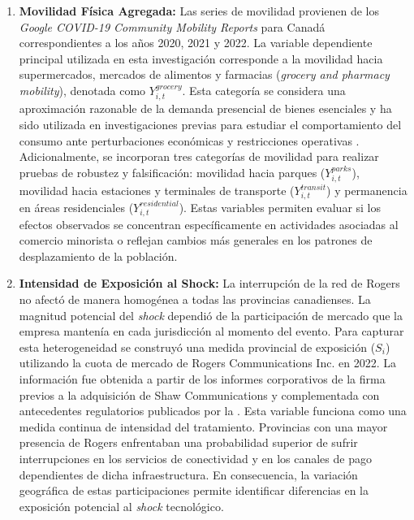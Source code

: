 \begin{enumerate}
    \item \textbf{Movilidad F\'isica Agregada:} Las series de movilidad provienen de los \textit{Google COVID-19 Community 
Mobility Reports} para Canad\'a correspondientes a los a\~nos 2020, 2021 y 2022. La variable dependiente principal utilizada en esta investigaci\'on corresponde 
a la movilidad hacia supermercados, mercados de alimentos y farmacias 
(\textit{grocery and pharmacy mobility}), denotada como $Y_{i,t}^{grocery}$. Esta 
categor\'ia se considera una aproximaci\'on razonable de la demanda presencial 
de bienes esenciales y ha sido utilizada en investigaciones previas para estudiar 
el comportamiento del consumo ante perturbaciones econ\'omicas y restricciones 
operativas \citep{chetty2020economic, bounie2020consumers}.
Adicionalmente, se incorporan tres categor\'ias de movilidad para realizar 
pruebas de robustez y falsificaci\'on: movilidad hacia parques 
($Y_{i,t}^{parks}$), movilidad hacia estaciones y terminales de transporte 
($Y_{i,t}^{transit}$) y permanencia en \'areas residenciales 
($Y_{i,t}^{residential}$). Estas variables permiten evaluar si los efectos 
observados se concentran espec\'ificamente en actividades asociadas al comercio 
minorista o reflejan cambios m\'as generales en los patrones de desplazamiento 
de la poblaci\'on.
    \item \textbf{Intensidad de Exposici\'on al Shock:} La interrupci\'on de la red de Rogers no afect\'o de manera homog\'enea a todas 
las provincias canadienses. La magnitud potencial del \textit{shock} dependi\'o 
de la participaci\'on de mercado que la empresa manten\'ia en cada jurisdicci\'on 
al momento del evento.
Para capturar esta heterogeneidad se construy\'o una medida provincial de 
exposici\'on ($S_i$) utilizando la cuota de mercado de Rogers Communications 
Inc. en 2022. La informaci\'on fue obtenida a partir de los informes 
corporativos de la firma previos a la adquisici\'on de Shaw Communications 
\citep{rogers2022q3} y complementada con antecedentes regulatorios publicados por 
la \citep{crtc2024rogers}.
Esta variable funciona como una medida continua de intensidad del tratamiento. 
Provincias con una mayor presencia de Rogers enfrentaban una probabilidad 
superior de sufrir interrupciones en los servicios de conectividad y en los 
canales de pago dependientes de dicha infraestructura. En consecuencia, la 
variaci\'on geogr\'afica de estas participaciones permite identificar 
diferencias en la exposici\'on potencial al \textit{shock} tecnol\'ogico.

\end{enumerate}
